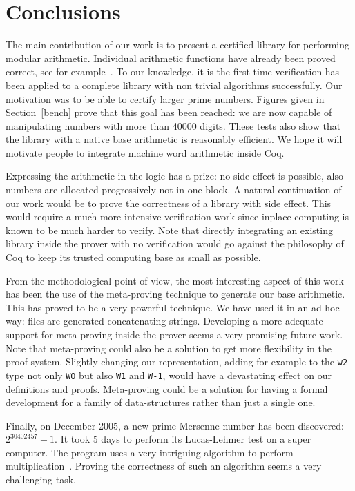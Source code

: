 \section{Conclusions}

The main contribution of our work is to present a certified library for performing
modular arithmetic. Individual arithmetic functions have already been proved correct,
see for example~\cite{BerMagZim02}. To our knowledge, it is the first time verification
has been applied to a complete library  with non trivial algorithms successfully.
Our motivation was to be able to certify  larger prime numbers. Figures given in Section~\ref{bench} 
prove that this goal has been reached: we are now capable of manipulating numbers with more than 40000 digits.
These tests also show that the library with a native base arithmetic is
reasonably efficient. We hope it will motivate people to integrate machine word arithmetic inside {\sc Coq}.

Expressing the arithmetic in the logic has a prize: no side effect is possible, 
also numbers are allocated progressively not in one block.
A natural continuation of our work would be to prove the correctness of a library with side effect.
This would require a much more intensive verification work since inplace computing
is known to be much harder to verify.
Note that directly integrating an existing library inside the prover with no verification
would go against the philosophy of {\sc Coq} to keep its trusted computing base as small
as possible.

From the methodological point of view, the most interesting aspect of this work
has been the use of the meta-proving technique to generate our base arithmetic. This has proved
to be a very powerful technique. We have used it in an ad-hoc way: files are generated concatenating
strings. Developing a more adequate support for meta-proving inside the prover seems a
very promising future work. Note that meta-proving could also be a solution to get more flexibility
in the proof system. Slightly changing our representation, adding for example to  the {\tt w2} type not only {\tt WO}
but also {\tt W1} and {\tt W-1}, would have a devastating effect on our definitions and proofs.
Meta-proving could be a solution for having a formal development for a family of data-structures rather than
just a single one.

Finally, on December 2005, a new prime Mersenne number has been discovered: $2 ^{30402457} - 1$.
It took 5 days to  perform its Lucas-Lehmer test on a super computer. 
The program uses a very intriguing algorithm to perform 
multiplication~\cite{crandall}. 
Proving the correctness of
such an algorithm seems a very challenging task. 
